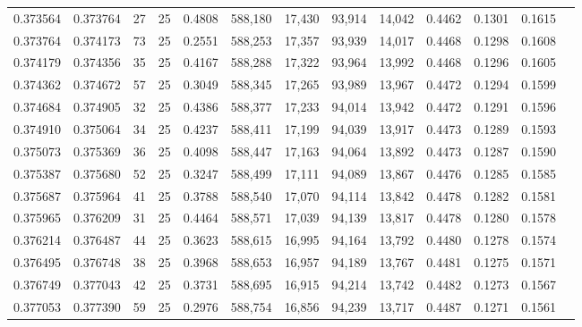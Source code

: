 \begin{tabular}{rrrrrrrrrrrrr}
0.373564 & 0.373764 &    27 &  25 &                                     0.4808 & 588,180 &  17,430 &  93,914 &  14,042 & 0.4462 & 0.1301 & 0.1615 \\
0.373764 & 0.374173 &    73 &  25 &                                     0.2551 & 588,253 &  17,357 &  93,939 &  14,017 & 0.4468 & 0.1298 & 0.1608 \\
0.374179 & 0.374356 &    35 &  25 &                                     0.4167 & 588,288 &  17,322 &  93,964 &  13,992 & 0.4468 & 0.1296 & 0.1605 \\
0.374362 & 0.374672 &    57 &  25 &                                     0.3049 & 588,345 &  17,265 &  93,989 &  13,967 & 0.4472 & 0.1294 & 0.1599 \\
0.374684 & 0.374905 &    32 &  25 &                                     0.4386 & 588,377 &  17,233 &  94,014 &  13,942 & 0.4472 & 0.1291 & 0.1596 \\
0.374910 & 0.375064 &    34 &  25 &                                     0.4237 & 588,411 &  17,199 &  94,039 &  13,917 & 0.4473 & 0.1289 & 0.1593 \\
0.375073 & 0.375369 &    36 &  25 &                                     0.4098 & 588,447 &  17,163 &  94,064 &  13,892 & 0.4473 & 0.1287 & 0.1590 \\
0.375387 & 0.375680 &    52 &  25 &                                     0.3247 & 588,499 &  17,111 &  94,089 &  13,867 & 0.4476 & 0.1285 & 0.1585 \\
0.375687 & 0.375964 &    41 &  25 &                                     0.3788 & 588,540 &  17,070 &  94,114 &  13,842 & 0.4478 & 0.1282 & 0.1581 \\
0.375965 & 0.376209 &    31 &  25 &                                     0.4464 & 588,571 &  17,039 &  94,139 &  13,817 & 0.4478 & 0.1280 & 0.1578 \\
0.376214 & 0.376487 &    44 &  25 &                                     0.3623 & 588,615 &  16,995 &  94,164 &  13,792 & 0.4480 & 0.1278 & 0.1574 \\
0.376495 & 0.376748 &    38 &  25 &                                     0.3968 & 588,653 &  16,957 &  94,189 &  13,767 & 0.4481 & 0.1275 & 0.1571 \\
0.376749 & 0.377043 &    42 &  25 &                                     0.3731 & 588,695 &  16,915 &  94,214 &  13,742 & 0.4482 & 0.1273 & 0.1567 \\
0.377053 & 0.377390 &    59 &  25 &                                     0.2976 & 588,754 &  16,856 &  94,239 &  13,717 & 0.4487 & 0.1271 & 0.1561 \\

\end{tabular}
